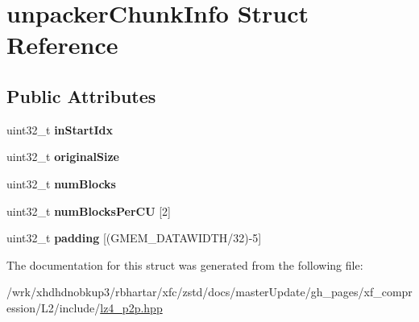 \hypertarget{structunpackerChunkInfo}{\section{unpacker\-Chunk\-Info Struct Reference}
\label{structunpackerChunkInfo}
}
\subsection*{Public Attributes}
\begin{DoxyCompactItemize}
\item 
\hypertarget{structunpackerChunkInfo_ae0cfab878c9220194e5bd27d8cda4066}{uint32\-\_\-t {\bfseries in\-Start\-Idx}}\label{structunpackerChunkInfo_ae0cfab878c9220194e5bd27d8cda4066}

\item 
\hypertarget{structunpackerChunkInfo_ae0c63fe150a2862355abaa9105ccfa8b}{uint32\-\_\-t {\bfseries original\-Size}}\label{structunpackerChunkInfo_ae0c63fe150a2862355abaa9105ccfa8b}

\item 
\hypertarget{structunpackerChunkInfo_aa5dd30f0efca1cd503347e400f002d75}{uint32\-\_\-t {\bfseries num\-Blocks}}\label{structunpackerChunkInfo_aa5dd30f0efca1cd503347e400f002d75}

\item 
\hypertarget{structunpackerChunkInfo_aa298c12f402078e95acef4dfac17c1e1}{uint32\-\_\-t {\bfseries num\-Blocks\-Per\-C\-U} \mbox{[}2\mbox{]}}\label{structunpackerChunkInfo_aa298c12f402078e95acef4dfac17c1e1}

\item 
\hypertarget{structunpackerChunkInfo_a27ef665c9e23274a53566dc78e489dd9}{uint32\-\_\-t {\bfseries padding} \mbox{[}(G\-M\-E\-M\-\_\-\-D\-A\-T\-A\-W\-I\-D\-T\-H/32)-\/5\mbox{]}}\label{structunpackerChunkInfo_a27ef665c9e23274a53566dc78e489dd9}

\end{DoxyCompactItemize}


The documentation for this struct was generated from the following file\-:\begin{DoxyCompactItemize}
\item 
/wrk/xhdhdnobkup3/rbhartar/xfc/zstd/docs/master\-Update/gh\-\_\-pages/xf\-\_\-compression/\-L2/include/\hyperlink{lz4__p2p_8hpp}{lz4\-\_\-p2p.\-hpp}\end{DoxyCompactItemize}
